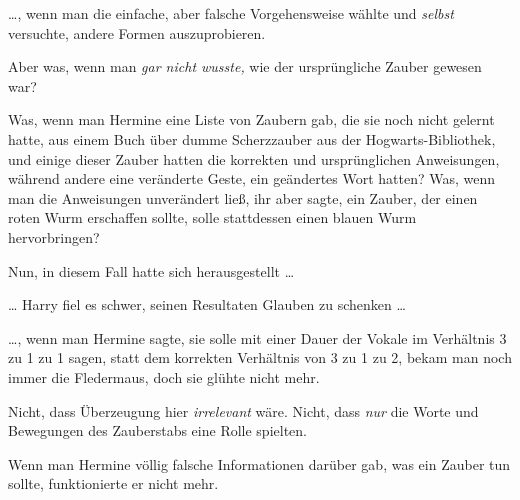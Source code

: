 …, wenn man die einfache, aber falsche Vorgehensweise wählte und \emph{selbst} versuchte, andere Formen auszuprobieren.

Aber was, wenn man \emph{gar nicht wusste,} wie der ursprüngliche Zauber gewesen war?

Was, wenn man Hermine eine Liste von Zaubern gab, die sie noch nicht gelernt hatte, aus einem Buch über dumme Scherzzauber aus der Hogwarts-Bibliothek, und einige dieser Zauber hatten die korrekten und ursprünglichen Anweisungen, während andere eine veränderte Geste, ein geändertes Wort hatten? Was, wenn man die Anweisungen unverändert ließ, ihr aber sagte, ein Zauber, der einen roten Wurm erschaffen sollte, solle stattdessen einen blauen Wurm hervorbringen?

Nun, in diesem Fall hatte sich herausgestellt …

… Harry fiel es schwer, seinen Resultaten Glauben zu schenken …

…, wenn man Hermine sagte, sie solle  mit einer Dauer der Vokale im Verhältnis 3 zu 1 zu 1 sagen, statt dem korrekten Verhältnis von 3 zu 1 zu 2, bekam man noch immer die Fledermaus, doch sie glühte nicht mehr.

Nicht, dass Überzeugung hier \emph{irrelevant} wäre. Nicht, dass \emph{nur} die Worte und Bewegungen des Zauberstabs eine Rolle spielten.

Wenn man Hermine völlig falsche Informationen darüber gab, was ein Zauber tun sollte, funktionierte er nicht mehr.

